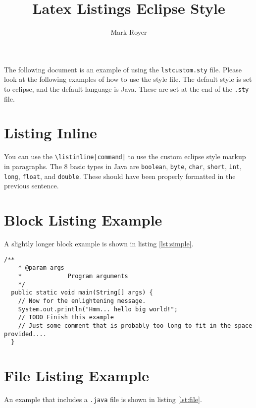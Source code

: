 \documentclass{article}
\title{Latex Listings Eclipse Style}
\date{}
\author{Mark Royer}
\begin{document}
\abstract

The following document is an example of using the
\texttt{lstcustom.sty} file.  Please look at the following examples
of how to use the style file. The default style is set to eclipse, and
the default language is Java.  These are set at the end of the
\texttt{.sty} file.

\section*{Listing Inline}

\lstset{breaklines=false}

You can use the \texttt{\textbackslash listinline|command|} to use the custom
eclipse style markup in paragraphs.  The 8 basic types in Java are
\lstinline|boolean|, \lstinline|byte|, \lstinline|char|,
\lstinline|short|, \lstinline|int|, \lstinline|long|,
\lstinline|float|, and \lstinline|double|. These should have been
properly formatted in the previous sentence.

\lstset{breaklines=true}

\section*{Block Listing Example}

A slightly longer block example is shown in listing \ref{lst:simple}.

\begin{lstlisting}[caption={A simple listing.}, label={lst:simple}]
  /**
    * @param args
    *             Program arguments
    */
  public static void main(String[] args) {
    // Now for the enlightening message.
    System.out.println("Hmm... hello big world!";
    // TODO Finish this example
    // Just some comment that is probably too long to fit in the space provided....
  }
\end{lstlisting}

\section*{File Listing Example}

An example that includes a \texttt{.java} file is shown in listing \ref{lst:file}.


\end{document}
